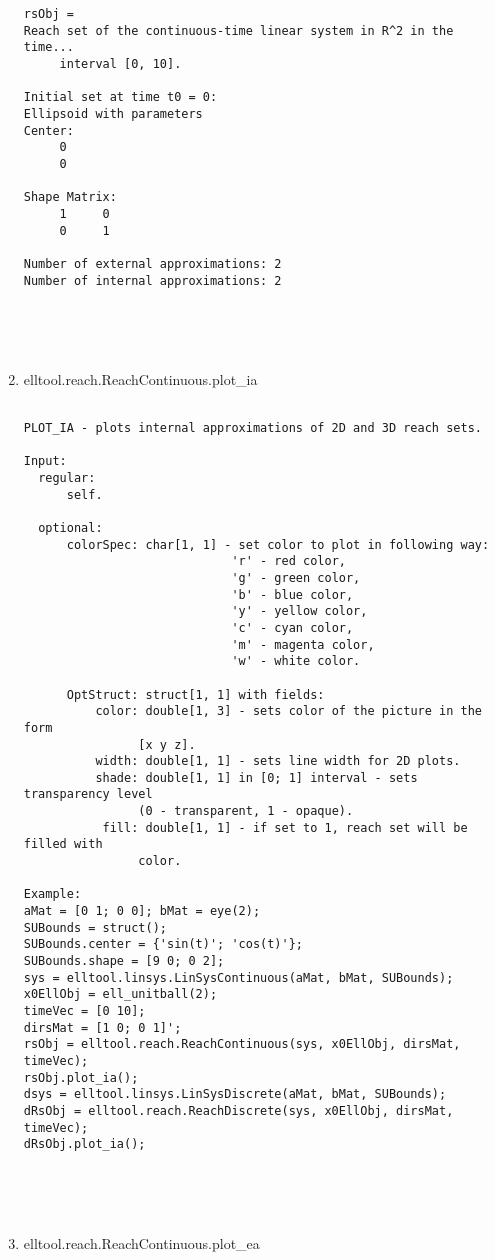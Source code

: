 \begin{enumerate}
\begin{lstlisting}
rsObj =
Reach set of the continuous-time linear system in R^2 in the time...
     interval [0, 10].

Initial set at time t0 = 0:
Ellipsoid with parameters
Center:
     0
     0

Shape Matrix:
     1     0
     0     1

Number of external approximations: 2
Number of internal approximations: 2





\end{lstlisting}
\fontfamily{\familydefault}
\selectfont
\item {elltool.reach.ReachContinuous.plot\_ia}
\selectfont
\begin{lstlisting}

PLOT_IA - plots internal approximations of 2D and 3D reach sets.

Input:
  regular:
      self.

  optional:
      colorSpec: char[1, 1] - set color to plot in following way:
                             'r' - red color,
                             'g' - green color,
                             'b' - blue color,
                             'y' - yellow color,
                             'c' - cyan color,
                             'm' - magenta color,
                             'w' - white color.

      OptStruct: struct[1, 1] with fields:
          color: double[1, 3] - sets color of the picture in the form
                [x y z].
          width: double[1, 1] - sets line width for 2D plots.
          shade: double[1, 1] in [0; 1] interval - sets transparency level
                (0 - transparent, 1 - opaque).
           fill: double[1, 1] - if set to 1, reach set will be filled with
                color.

Example:
aMat = [0 1; 0 0]; bMat = eye(2);
SUBounds = struct();
SUBounds.center = {'sin(t)'; 'cos(t)'};
SUBounds.shape = [9 0; 0 2];
sys = elltool.linsys.LinSysContinuous(aMat, bMat, SUBounds);
x0EllObj = ell_unitball(2);
timeVec = [0 10];
dirsMat = [1 0; 0 1]';
rsObj = elltool.reach.ReachContinuous(sys, x0EllObj, dirsMat, timeVec);
rsObj.plot_ia();
dsys = elltool.linsys.LinSysDiscrete(aMat, bMat, SUBounds);
dRsObj = elltool.reach.ReachDiscrete(sys, x0EllObj, dirsMat, timeVec);
dRsObj.plot_ia();





\end{lstlisting}
\fontfamily{\familydefault}
\selectfont
\item {elltool.reach.ReachContinuous.plot\_ea}
\selectfont
\begin{lstlisting}


\end{lstlisting}
\end{enumerate}
